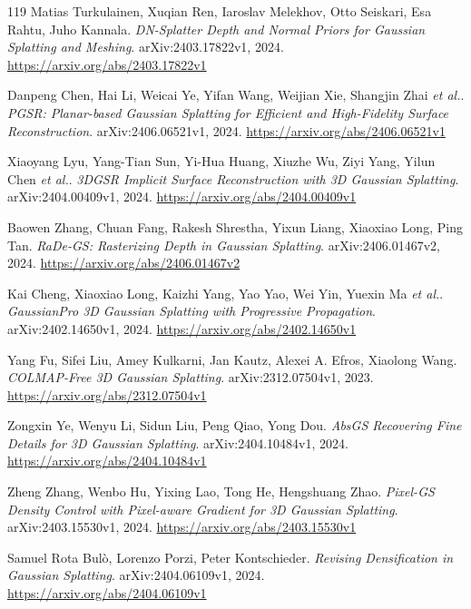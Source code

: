 \documentclass[11pt,a4paper]{article}
\begin{document}
\begin{thebibliography}{119}
Matias Turkulainen, Xuqian Ren, Iaroslav Melekhov, Otto Seiskari, Esa Rahtu, Juho Kannala.
\newblock \emph{DN-Splatter Depth and Normal Priors for Gaussian Splatting and Meshing}.
\newblock arXiv:2403.17822v1, 2024.
\newblock \url{https://arxiv.org/abs/2403.17822v1}

Danpeng Chen, Hai Li, Weicai Ye, Yifan Wang, Weijian Xie, Shangjin Zhai \emph{et al.}.
\newblock \emph{PGSR: Planar-based Gaussian Splatting for Efficient and High-Fidelity Surface Reconstruction}.
\newblock arXiv:2406.06521v1, 2024.
\newblock \url{https://arxiv.org/abs/2406.06521v1}

Xiaoyang Lyu, Yang-Tian Sun, Yi-Hua Huang, Xiuzhe Wu, Ziyi Yang, Yilun Chen \emph{et al.}.
\newblock \emph{3DGSR Implicit Surface Reconstruction with 3D Gaussian Splatting}.
\newblock arXiv:2404.00409v1, 2024.
\newblock \url{https://arxiv.org/abs/2404.00409v1}

Baowen Zhang, Chuan Fang, Rakesh Shrestha, Yixun Liang, Xiaoxiao Long, Ping Tan.
\newblock \emph{RaDe-GS: Rasterizing Depth in Gaussian Splatting}.
\newblock arXiv:2406.01467v2, 2024.
\newblock \url{https://arxiv.org/abs/2406.01467v2}

Kai Cheng, Xiaoxiao Long, Kaizhi Yang, Yao Yao, Wei Yin, Yuexin Ma \emph{et al.}.
\newblock \emph{GaussianPro 3D Gaussian Splatting with Progressive Propagation}.
\newblock arXiv:2402.14650v1, 2024.
\newblock \url{https://arxiv.org/abs/2402.14650v1}

Yang Fu, Sifei Liu, Amey Kulkarni, Jan Kautz, Alexei A. Efros, Xiaolong Wang.
\newblock \emph{COLMAP-Free 3D Gaussian Splatting}.
\newblock arXiv:2312.07504v1, 2023.
\newblock \url{https://arxiv.org/abs/2312.07504v1}

Zongxin Ye, Wenyu Li, Sidun Liu, Peng Qiao, Yong Dou.
\newblock \emph{AbsGS Recovering Fine Details for 3D Gaussian Splatting}.
\newblock arXiv:2404.10484v1, 2024.
\newblock \url{https://arxiv.org/abs/2404.10484v1}

Zheng Zhang, Wenbo Hu, Yixing Lao, Tong He, Hengshuang Zhao.
\newblock \emph{Pixel-GS Density Control with Pixel-aware Gradient for 3D Gaussian Splatting}.
\newblock arXiv:2403.15530v1, 2024.
\newblock \url{https://arxiv.org/abs/2403.15530v1}

Samuel Rota Bul\`{o}, Lorenzo Porzi, Peter Kontschieder.
\newblock \emph{Revising Densification in Gaussian Splatting}.
\newblock arXiv:2404.06109v1, 2024.
\newblock \url{https://arxiv.org/abs/2404.06109v1}


\end{thebibliography}
\end{document}
